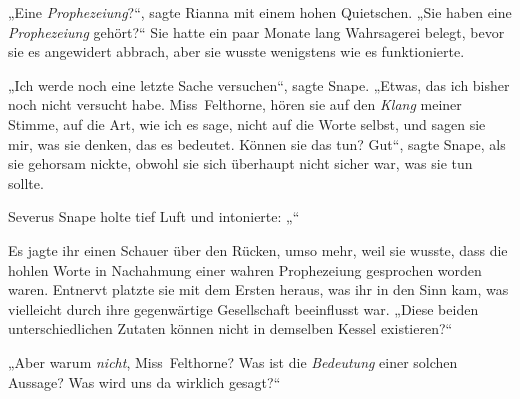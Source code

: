 „Eine \emph{Prophezeiung}?“, sagte Rianna mit einem hohen Quietschen.
„Sie haben eine \emph{Prophezeiung} gehört?“ Sie hatte ein paar Monate lang Wahrsagerei belegt, bevor sie es angewidert abbrach, aber sie wusste wenigstens wie es funktionierte.

„Ich werde noch eine letzte Sache versuchen“, sagte Snape.
„Etwas, das ich bisher noch nicht versucht habe. Miss~Felthorne, hören sie auf den \emph{Klang} meiner Stimme, auf die Art, wie ich es sage, nicht auf die Worte selbst, und sagen sie mir, was sie denken, das es bedeutet. Können sie das tun? Gut“, sagte Snape, als sie gehorsam nickte, obwohl sie sich überhaupt nicht sicher war, was sie tun sollte.

Severus Snape holte tief Luft und intonierte: „“

Es jagte ihr einen Schauer über den Rücken, umso mehr, weil sie wusste, dass die hohlen Worte in Nachahmung einer wahren Prophezeiung gesprochen worden waren. Entnervt platzte sie mit dem Ersten heraus, was ihr in den Sinn kam, was vielleicht durch ihre gegenwärtige Gesellschaft beeinflusst war.
„Diese beiden unterschiedlichen Zutaten können nicht in demselben Kessel existieren?“

„Aber warum \emph{nicht}, Miss~Felthorne? Was ist die \emph{Bedeutung} einer solchen Aussage? Was wird uns da wirklich gesagt?“

